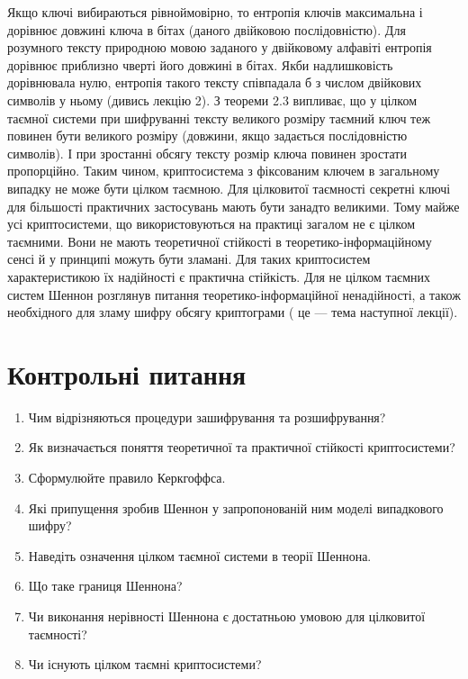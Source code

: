 Якщо ключі вибираються рівноймовірно, то ентропія ключів максимальна і дорівнює
довжині ключа в бітах (даного двійковою послідовністю). Для розумного тексту
природною мовою заданого у двійковому алфавіті ентропія дорівнює приблизно
чверті його довжині в бітах. Якби надлишковість дорівнювала нулю, ентропія
такого тексту співпадала б з числом двійкових символів у ньому (дивись лекцію
2). З теореми 2.3 випливає, що у цілком таємної системи при шифруванні тексту
великого розміру таємний ключ теж повинен бути великого розміру (довжини, якщо
задається послідовністю символів). І при зростанні обсягу тексту розмір ключа
повинен зростати пропорційно. Таким чином, криптосистема з фіксованим ключем в
загальному випадку не може бути цілком таємною. Для цілковитої таємності
секретні ключі для більшості практичних застосувань мають бути занадто
великими. Тому майже усі криптосистеми, що використовуються на практиці загалом
не є цілком таємними. Вони не мають теоретичної стійкості в
теоретико-інформаційному сенсі й  у принципі можуть бути зламані. Для таких
криптосистем характеристикою їх надійності є практична стійкість. Для не цілком
таємних систем Шеннон розглянув питання теоретико-інформаційної ненадійності, а
також необхідного для зламу шифру обсягу криптограми ( це --- тема наступної
лекції).


\bigskip

\section{Контрольні питання}


\bigskip


\bigskip

\liststyleWWviiiNumxlv
\begin{enumerate}
\item Чим відрізняються процедури зашифрування та розшифрування?
\item Як визначається поняття теоретичної та практичної стійкості криптосистеми?
\item Сформулюйте правило Керкгоффса.
\item Які припущення зробив Шеннон у запропонованій ним моделі випадкового
шифру?
\item Наведіть означення цілком таємної системи в теорії Шеннона.
\item Що таке границя Шеннона?
\item Чи виконання нерівності Шеннона є достатньою умовою для цілковитої
таємності?
\item Чи існують цілком таємні криптосистеми? 
\end{enumerate}

